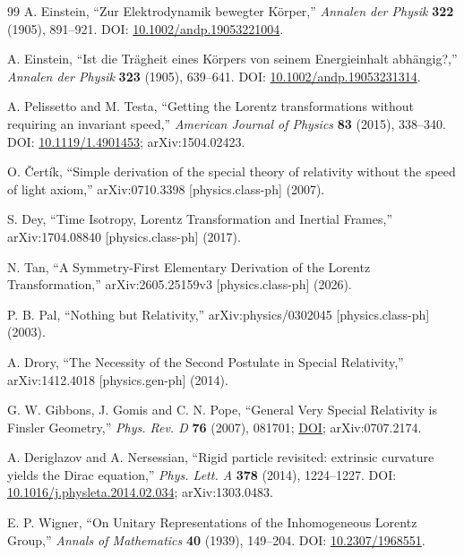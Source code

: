 \documentclass[11pt,a4paper]{article}
\begin{document}
\begin{thebibliography}{99}
A. Einstein, ``Zur Elektrodynamik bewegter K\"orper,'' \emph{Annalen der Physik} \textbf{322} (1905), 891--921. DOI: \href{https://doi.org/10.1002/andp.19053221004}{10.1002/andp.19053221004}.

A. Einstein, ``Ist die Tr\"agheit eines K\"orpers von seinem Energieinhalt abh\"angig?,'' \emph{Annalen der Physik} \textbf{323} (1905), 639--641. DOI: \href{https://doi.org/10.1002/andp.19053231314}{10.1002/andp.19053231314}.

A. Pelissetto and M. Testa, ``Getting the Lorentz transformations without requiring an invariant speed,'' \emph{American Journal of Physics} \textbf{83} (2015), 338--340. DOI: \href{https://doi.org/10.1119/1.4901453}{10.1119/1.4901453}; arXiv:1504.02423.

O. \v{C}ert\'ik, ``Simple derivation of the special theory of relativity without the speed of light axiom,'' arXiv:0710.3398 [physics.class-ph] (2007).

S. Dey, ``Time Isotropy, Lorentz Transformation and Inertial Frames,'' arXiv:1704.08840 [physics.class-ph] (2017).

N. Tan, ``A Symmetry-First Elementary Derivation of the Lorentz Transformation,'' arXiv:2605.25159v3 [physics.class-ph] (2026).

P. B. Pal, ``Nothing but Relativity,'' arXiv:physics/0302045 [physics.class-ph] (2003).

A. Drory, ``The Necessity of the Second Postulate in Special Relativity,'' arXiv:1412.4018 [physics.gen-ph] (2014).

G. W. Gibbons, J. Gomis and C. N. Pope, ``General Very Special Relativity is Finsler Geometry,'' \emph{Phys. Rev. D} \textbf{76} (2007), 081701; \href{https://doi.org/10.1103/PhysRevD.76.081701}{DOI}; arXiv:0707.2174.

A. Deriglazov and A. Nersessian, ``Rigid particle revisited: extrinsic curvature yields the Dirac equation,'' \emph{Phys. Lett. A} \textbf{378} (2014), 1224--1227. DOI: \href{https://doi.org/10.1016/j.physleta.2014.02.034}{10.1016/j.physleta.2014.02.034}; arXiv:1303.0483.


E. P. Wigner, ``On Unitary Representations of the Inhomogeneous Lorentz Group,'' \emph{Annals of Mathematics} \textbf{40} (1939), 149--204. DOI: \href{https://doi.org/10.2307/1968551}{10.2307/1968551}.


\end{thebibliography}
\end{document}
